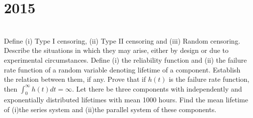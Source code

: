 \section*{2015}
\vspace{-.5cm}
\hrulefill \smallskip\\
 Define (i) Type I censoring, (ii) Type II censoring and (iii) Random censoring. Describe the situations in which they may arise, either by design or due to experimental circumstances.
\myline
{} Define (i) the reliability function and (ii) the failure rate function of a random variable denoting lifetime of a component. Establish the relation between them, if any. Prove that if $h(t)$ is the failure rate function, then $\int_0^{\infty}h(t)dt = \infty$.
\myline
{} Let there be three components with independently and exponentially distributed lifetimes with mean 1000 hours. Find the mean lifetime of (i)the series system and (ii)the parallel system of these components.